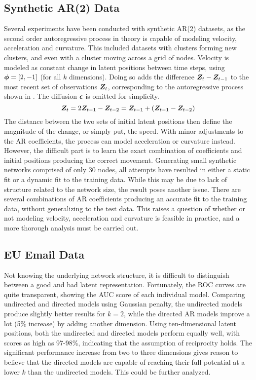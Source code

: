     \subsection{Synthetic AR(2) Data}
    
        Several experiments have been conducted with synthetic AR(2) datasets, as the second order autoregressive process in theory is capable of modeling velocity, acceleration and curvature. This included datasets with clusters forming new clusters, and even with a cluster moving across a grid of nodes. 
        Velocity is modeled as constant change in latent positions between time steps, using $\bm{\phi}=[2,-1]$ (for all $k$ dimensions). Doing so adds the difference $\bm{Z}_t - \bm{Z}_{t-1}$ to the most recent set of observations $\bm{Z}_t$, corresponding to the autoregressive process shown in . The diffusion $\bm{\epsilon}$ is omitted for simplicity.
        \begin{equation}\label{eq:data-velocity}
            \bm{Z}_t = 2 \bm{Z}_{t-1} - \bm{Z}_{t-2} = \bm{Z}_{t-1} + (\bm{Z}_{t-1} - \bm{Z}_{t-2})
        \end{equation}
        The distance between the two sets of initial latent positions then define the magnitude of the change, or simply put, the speed. With minor adjustments to the AR coefficients, the process can model acceleration or curvature instead. However, the difficult part is to learn the exact combination of coefficients and initial positions producing the correct movement. Generating small synthetic networks comprised of only 30 nodes, all attempts have resulted in either a static fit or a dynamic fit to the training data. While this may be due to lack of structure related to the network size, the result poses another issue. There are several combinations of AR coefficients producing an accurate fit to the training data, without generalizing to the test data. 
        This raises a question of whether or not modeling velocity, acceleration and curvature is feasible in practice, and a more thorough analysis must be carried out.

    \subsection{EU Email Data}
    
        Not knowing the underlying network structure, it is difficult to distinguish between a good and bad latent representation. Fortunately, the ROC curves are quite transparent, showing the AUC score of each individual model. Comparing undirected and directed models using Gaussian penalty, the undirected models produce slightly better results for $k=2$, while the directed AR models improve a lot (5\% increase) by adding another dimension. Using ten-dimensional latent positions, both the undirected and directed models perform equally well, with scores as high as 97-98\%, indicating that the assumption of reciprocity holds. The significant performance increase from two to three dimensions gives reason to believe that the directed models are capable of reaching their full potential at a lower $k$ than the undirected models. This could be further analyzed.
        

